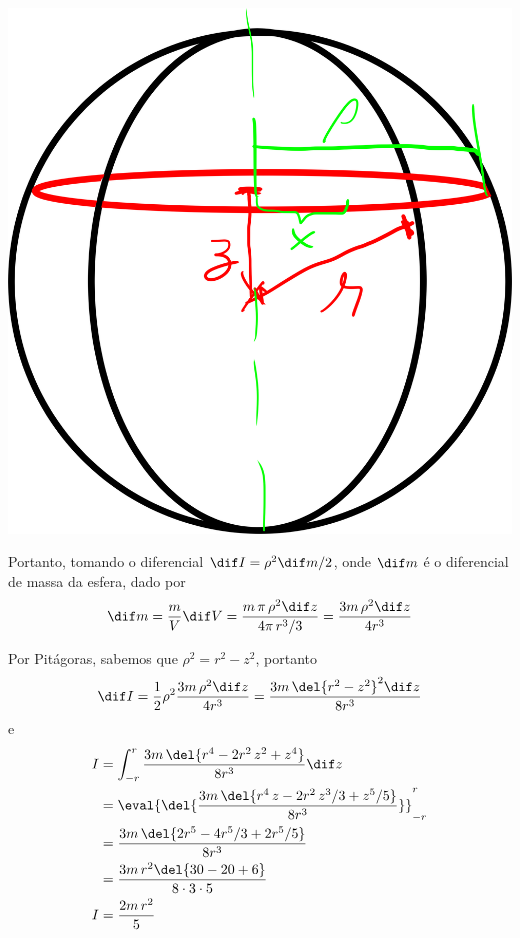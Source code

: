 \documentclass[]{IMTexam}
\begin{document}
\begin{questions}
\begin{parts}
\begin{solution}
\begin{multi}
				\nextcol

				\includegraphics[width=1\linewidth]{fig3}

			\end{multi}


			Portanto, tomando o diferencial $ \dif I=\rho^{2}\dif m/2 $, onde $ \dif m $ é o diferencial de massa da esfera, dado por
			\[ \dif m=\dfrac{m}{V}\dif V=\dfrac{m\,\pi\,\rho^{2}\dif z}{4\pi\,r^{3}/3}=\dfrac{3m\,\rho^{2}\dif z}{4r^{3}} \]

			Por Pitágoras, sabemos que $ \rho^{2}=r^{2}-z^{2} $, portanto
			\[ \dif I=\dfrac{1}{2}\rho^{2}\dfrac{3m\,\rho^{2}\dif z}{4r^{3}}=\dfrac{3m\,\del{r^{2}-z^{2}}^{2}\dif z}{8r^{3}} \]
			e
			\begin{align*}
				I & =\int_{-r}^{r}\dfrac{3m\,\del{r^{4}-2r^{2}\,z^{2}+z^{4}}}{8r^{3}}\dif z           \\
				  & =\eval{\del{\dfrac{3m\,\del{r^{4}\,z-2r^{2}\,z^{3}/3+z^{5}/5}}{8r^{3}}}}_{-r}^{r} \\
				  & =\dfrac{3m\,\del{2r^{5}-4r^{5}/3+2r^{5}/5}}{8r^{3}}                               \\
				  & =\dfrac{3m\,r^{2}\del{30-20+6}}{8\cdot3\cdot5}                                    \\
				I & =\dfrac{2m\,r^{2}}{5}
			\end{align*}
		\end{solution}


\end{parts}
\end{questions}
\end{document}
